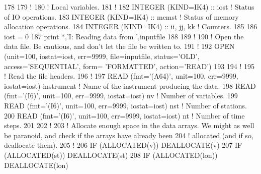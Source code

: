 \begin{DoxyCode}
178 
179     \textcolor{comment}{!}
180     \textcolor{comment}{! Local variables.}
181     \textcolor{comment}{!}
182     \textcolor{keywordtype}{INTEGER (KIND=IK4)}                                                  :: iost         \textcolor{comment}{! Status of IO
       operations.}
183     \textcolor{keywordtype}{INTEGER (KIND=IK4)}                                                  :: memst        \textcolor{comment}{! Status of memory
       allocation operations.}
184     \textcolor{keywordtype}{INTEGER (KIND=IK4)}                                                  :: ii, jj, kk   \textcolor{comment}{! Counters.}
185 
186     iost    = 0
187     print *,\textcolor{stringliteral}{'I: Reading data from '},inputfile
188 
189     \textcolor{comment}{!}
190     \textcolor{comment}{! Open the data file. Be cautious, and don't let the file be written to.}
191     \textcolor{comment}{!}
192     \textcolor{keyword}{OPEN} (unit=100, iostat=iost, err=9999, file=inputfile, status=\textcolor{stringliteral}{'OLD'}, access=\textcolor{stringliteral}{'SEQUENTIAL'}, form=\textcolor{stringliteral}{
      'FORMATTED'}, action=\textcolor{stringliteral}{'READ'})
193 
194     \textcolor{comment}{!}
195     \textcolor{comment}{! Read the file headers.}
196     \textcolor{comment}{!}
197     \textcolor{keyword}{READ} (fmt=\textcolor{stringliteral}{'(A64)'}, unit=100, err=9999, iostat=iost) instrument         \textcolor{comment}{! Name of the instrument
       producing the data.}
198     \textcolor{keyword}{READ} (fmt=\textcolor{stringliteral}{'(I6)'}, unit=100, err=9999, iostat=iost) nv                  \textcolor{comment}{! Number of variables.}
199     \textcolor{keyword}{READ} (fmt=\textcolor{stringliteral}{'(I6)'}, unit=100, err=9999, iostat=iost) nst                 \textcolor{comment}{! Number of stations.}
200     \textcolor{keyword}{READ} (fmt=\textcolor{stringliteral}{'(I6)'}, unit=100, err=9999, iostat=iost) nt                  \textcolor{comment}{! Number of time steps.}
201 
202     \textcolor{comment}{!}
203     \textcolor{comment}{! Allocate enough space in the data arrays. We might as well be paranoid, and check if the arrays have
       already been}
204     \textcolor{comment}{! allocated (and if so, deallocate them).}
205     \textcolor{comment}{!}
206     \textcolor{keywordflow}{IF} (\textcolor{keyword}{ALLOCATED}(v))   \textcolor{keyword}{DEALLOCATE}(v)
207     \textcolor{keywordflow}{IF} (\textcolor{keyword}{ALLOCATED}(st))  \textcolor{keyword}{DEALLOCATE}(st)
208     \textcolor{keywordflow}{IF} (\textcolor{keyword}{ALLOCATED}(lon)) \textcolor{keyword}{DEALLOCATE}(lon)

\end{DoxyCode}

